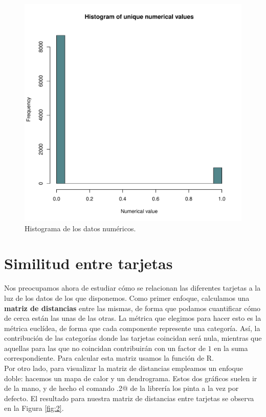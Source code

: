 \documentclass[11pt,a4paper]{article}
\begin{document}
\begin{figure}[h!]
  \centering
  \includegraphics[page=1, width=.7\textwidth]{Rplots.pdf}
  \caption{Histograma de los datos numéricos.}
  \label{fig:1}
\end{figure}

\section{Similitud entre tarjetas}

Nos preocupamos ahora de estudiar cómo se relacionan las diferentes tarjetas a la luz de los datos de los que disponemos. Como primer enfoque, calculamos una \textbf{matriz de distancias} entre las mismas, de forma que podamos cuantificar cómo de cerca están las unas de las otras. La métrica que elegimos para hacer esto es la métrica euclídea, de forma que cada componente represente una categoría. Así, la contribución de las categorías donde las tarjetas coincidan será nula, mientras que aquellas para las que no coincidan contribuirán con un factor de $1$ en la suma correspondiente. Para calcular esta matriz usamos la función \verb@dist@ de R.\\

Por otro lado, para visualizar la matriz de distancias empleamos un enfoque doble: hacemos un mapa de calor y un dendrograma. Estos dos gráficos suelen ir de la mano, y de hecho el comando \verb@heatmap.2@ de la librería \verb@gplots@ los pinta a la vez por defecto. El resultado para nuestra matriz de distancias entre tarjetas se observa en la Figura \ref{fig:2}.\\
\end{document}
